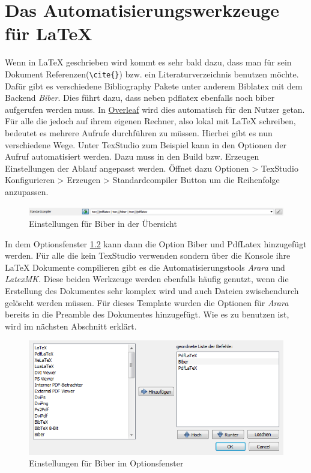 \chapter{Das Automatisierungswerkzeuge für \LaTeX{}}
\label{automate}
Wenn in \LaTeX{} geschrieben wird kommt es sehr bald dazu, dass man für sein Dokument Referenzen(\verb|\cite{}|) bzw. ein Literaturverzeichnis benutzen möchte. Dafür gibt es verschiedene Bibliography Pakete unter anderem Biblatex mit dem Backend \emph{Biber}. Dies führt dazu, dass neben pdflatex ebenfalls noch biber aufgerufen werden muss. In \href{www.overleaf.com}{Overleaf} wird dies automatisch für den Nutzer getan. Für alle die jedoch auf ihrem eigenen Rechner, also lokal mit \LaTeX{} schreiben, bedeutet es mehrere Aufrufe durchführen zu müssen. Hierbei gibt es nun verschiedene Wege. Unter TexStudio zum Beispiel kann in den Optionen der Aufruf automatisiert werden. Dazu muss in den Build bzw. Erzeugen Einstellungen der Ablauf angepasst werden. Öffnet dazu Optionen > TexStudio Konfigurieren > Erzeugen > Standardcompiler Button um die Reihenfolge anzupassen. 
\begin{figure}[ht]
	\centering
	\includegraphics[width=\textwidth]{images/texstudio_option_build.PNG}
	\caption{Einstellungen für Biber in der Übersicht}
	\label{figbuild}
\end{figure}

In dem Optionsfenster \ref{figbuildOptions} kann dann die Option Biber und PdfLatex hinzugefügt werden. Für alle die kein TexStudio verwenden sondern über die Konsole ihre \LaTeX{} Dokumente compilieren gibt es die Automatisierungstools \emph{Arara} und \emph{LatexMK}. Diese beiden Werkzeuge werden ebenfalls häufig genutzt, wenn die Erstellung des Dokumentes sehr komplex wird und auch Dateien zwischendurch gelöscht werden müssen. Für dieses Template wurden die Optionen für \emph{Arara} bereits in die Preamble des Dokumentes hinzugefügt. Wie es zu benutzen ist, wird im nächsten Abschnitt erklärt.

\begin{figure}[ht]
	\centering
	\includegraphics[width=\textwidth]{images/texstudio_optionwindow_build.PNG}
	\caption{Einstellungen für Biber im Optionsfenster}
	\label{figbuildOptions}
\end{figure}



